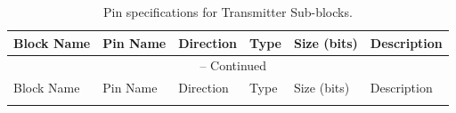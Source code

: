 \documentclass[12pt,singleside,a4paper]{report}
\begin{document}

\begin{longtable}{|p{2.5cm}|p{3cm}|p{1.5cm}|p{1.5cm}|p{1.2cm}|p{4.5cm}|}

\caption{Pin specifications for Transmitter Sub-blocks.}
\label{tab:tx_sub_blocks} \\

\hline
Block Name & Pin Name & Direction & Type & Size (bits) & Description \\ \hline
\endfirsthead

\multicolumn{6}{c}{\tablename\ \thetable{} -- Continued} \\ \hline
Block Name & Pin Name & Direction & Type & Size (bits) & Description \\ \hline
\endhead

\hline
\endlastfoot


\end{longtable}
\end{document}
